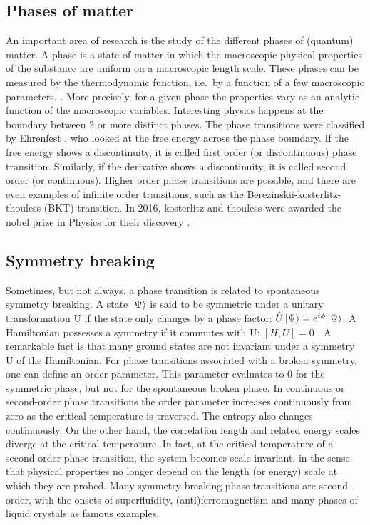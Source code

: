 \subsection{Phases of matter}

An important area of research is the study of the different phases of (quantum) matter. A phase is a state of matter in which the macroscopic physical properties of the substance are uniform on a macroscopic length scale. These phases can be measured by the thermodynamic function, i.e.\ by a function of a few macroscopic parameters. \cite{Nishimori2011}. More precisely, for a given phase the properties vary as an analytic function of the macroscopic variables.
Interesting physics happens at the boundary between 2 or more distinct phases. The phase transitions were classified by Ehrenfest \cite{Jaeger1998}, who looked at the free energy across the phase boundary. If the free energy shows a discontinuity, it is called first order (or discontinuous) phase transition. Similarly, if the derivative shows a discontinuity, it is called second order (or continuous). Higher order phase transitions are possible, and there are even examples of infinite order transitions, such as the Berezinskii-kosterlitz-thouless (BKT) transition.  In 2016, kosterlitz and thouless were awarded the nobel prize in Physics for their discovery \cite{Bletenholz2016}.

\subsection{Symmetry breaking}

Sometimes, but not always, a phase transition is  related to spontaneous symmetry breaking. A state $\ket{\Psi}$ is said to be symmetric under a unitary transformation U if the state only changes by a phase factor: $ \hat{U} \ket{\Psi} = e^{i \phi} \ket{\Psi} $. A Hamiltonian possesses a symmetry if it commutes with U: $ [H,U]=0$  \cite{Beekman2019}. A remarkable fact is that many ground states are not invariant under a symmetry U of the Hamiltonian.
For phase transitions associated with a broken symmetry, one can define an order parameter. This parameter evaluates to 0 for the symmetric phase, but not for the spontaneous broken phase.
In continuous or second-order phase transitions the order parameter increases continuously from zero as the critical temperature is traversed. The entropy also changes continuously. On the other hand, the correlation length and related energy scales diverge at the critical temperature. In fact, at the critical temperature of a second-order phase transition, the system becomes scale-invariant, in the sense that physical properties no longer depend on the length (or energy) scale at which they are probed. Many symmetry-breaking phase transitions are second-order, with the onsets of superfluidity, (anti)ferromagnetism and many phases of liquid crystals as famous examples\cite{Beekman2019}.


